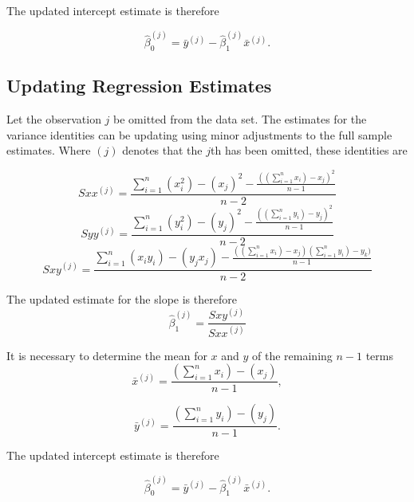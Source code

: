 \documentclass[MAIN.tex]{subfiles}
\begin{document}
The updated intercept estimate is therefore


\begin{equation}
\hat{\beta}_{0}^{(j)}=\bar{y}^{(j)}-\hat{\beta}_{1}^{(j)}\bar{x}^{(j)}.
\end{equation}





\subsection{Updating Regression Estimates}
Let the observation $j$ be omitted from the data set. The
estimates for the variance identities can be updating using minor
adjustments to the full sample estimates. Where $(j)$ denotes that
the $j$th has been omitted, these identities are

\begin{equation}
Sxx^{(j)}=\frac{\sum_{i=1}^{n}(x_{i}^{2})-(x_{j})^{2}-\frac{((\sum_{i=1}^{n}x_{i})-x_{j})^{2}}{n-1}}{n-2}
\end{equation}
\begin{equation}
Syy^{(j)}=\frac{\sum_{i=1}^{n}(y_{i}^{2})-(y_{j})^{2}-\frac{((\sum_{i=1}^{n}y_{i})-y_{j})^{2}}{n-1}}{n-2}
\end{equation}
\begin{equation}
Sxy^{(j)}=\frac{\sum_{i=1}^{n}(x_{i}y_{i})-(y_{j}x_{j})-\frac{((\sum_{i=1}^{n}x_{i})-x_{j})(\sum_{i=1}^{n}y_{i})-y_{k})}{n-1}}{n-2}
\end{equation}

The updated estimate for the slope is therefore
\begin{equation}
\hat{\beta}_{1}^{(j)}=\frac{Sxy^{(j)}}{Sxx^{(j)}}
\end{equation}

It is necessary to determine the mean for $x$ and $y$ of the
remaining $n-1$ terms
\begin{equation}
\bar{x}^{(j)}=\frac{(\sum_{i=1}^{n}x_{i})-(x_{j})}{n-1},
\end{equation}

\begin{equation}
\bar{y}^{(j)}=\frac{(\sum_{i=1}^{n}y_{i})-(y_{j})}{n-1}.
\end{equation}

The updated intercept estimate is therefore

\begin{equation}
\hat{\beta}_{0}^{(j)}=\bar{y}^{(j)}-\hat{\beta}_{1}^{(j)}\bar{x}^{(j)}.
\end{equation}
\end{document}
